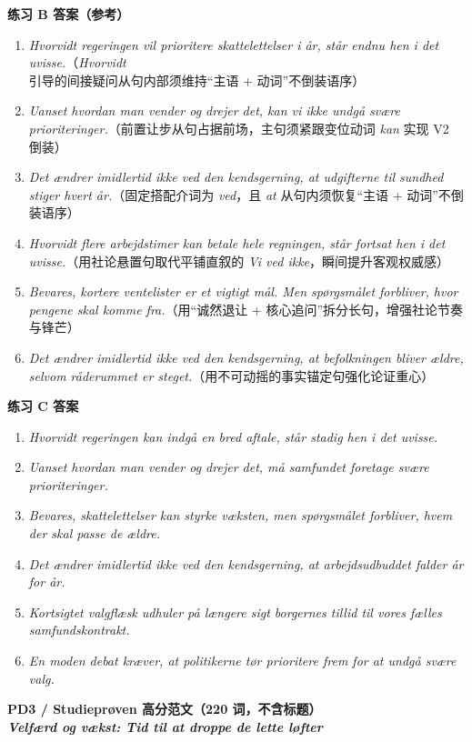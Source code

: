 \begin{answerbox}
\textbf{练习 B 答案（参考）}
\begin{enumerate}
  \item \textit{Hvorvidt regeringen vil prioritere skattelettelser i år, står endnu hen i det uvisse.}（\textit{Hvorvidt} 引导的间接疑问从句内部须维持“主语 + 动词”不倒装语序）
  \item \textit{Uanset hvordan man vender og drejer det, kan vi ikke undgå svære prioriteringer.}（前置让步从句占据前场，主句须紧跟变位动词 \textit{kan} 实现 V2 倒装）
  \item \textit{Det ændrer imidlertid ikke ved den kendsgerning, at udgifterne til sundhed stiger hvert år.}（固定搭配介词为 \textit{ved}，且 \textit{at} 从句内须恢复“主语 + 动词”不倒装语序）
  \item \textit{Hvorvidt flere arbejdstimer kan betale hele regningen, står fortsat hen i det uvisse.}（用社论悬置句取代平铺直叙的 \textit{Vi ved ikke}，瞬间提升客观权威感）
  \item \textit{Bevares, kortere ventelister er et vigtigt mål. Men spørgsmålet forbliver, hvor pengene skal komme fra.}（用“诚然退让 + 核心追问”拆分长句，增强社论节奏与锋芒）
  \item \textit{Det ændrer imidlertid ikke ved den kendsgerning, at befolkningen bliver ældre, selvom råderummet er steget.}（用不可动摇的事实锚定句强化论证重心）
\end{enumerate}

\textbf{练习 C 答案}
\begin{enumerate}
  \item \textit{Hvorvidt regeringen kan indgå en bred aftale, står stadig hen i det uvisse.}
  \item \textit{Uanset hvordan man vender og drejer det, må samfundet foretage svære prioriteringer.}
  \item \textit{Bevares, skattelettelser kan styrke væksten, men spørgsmålet forbliver, hvem der skal passe de ældre.}
  \item \textit{Det ændrer imidlertid ikke ved den kendsgerning, at arbejdsudbuddet falder år for år.}
  \item \textit{Kortsigtet valgflæsk udhuler på længere sigt borgernes tillid til vores fælles samfundskontrakt.}
  \item \textit{En moden debat kræver, at politikerne tør prioritere frem for at undgå svære valg.}
\end{enumerate}

\textbf{PD3 / Studieprøven 高分范文（220 词，不含标题）}\\
\textit{\textbf{Velfærd og vækst: Tid til at droppe de lette løfter}}


\end{answerbox}
